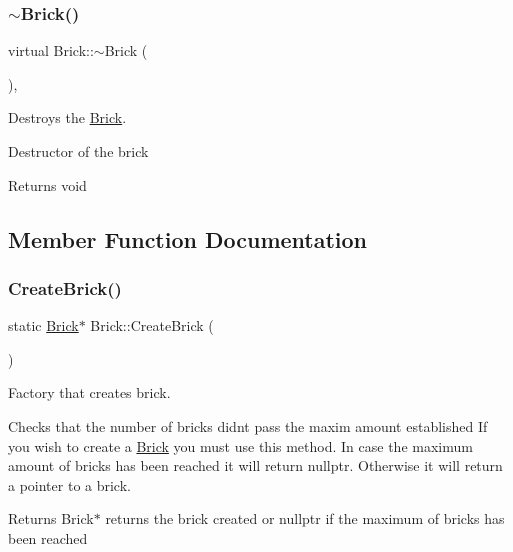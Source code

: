 \subsubsection{\texorpdfstring{$\sim$\+Brick()}{~Brick()}}
{\footnotesize\ttfamily virtual Brick\+::$\sim$\+Brick (\begin{DoxyParamCaption}{ }\end{DoxyParamCaption})\hspace{0.3cm}{\ttfamily [inline]}, {\ttfamily [virtual]}}



Destroys the \hyperlink{class_brick}{Brick}. 

Destructor of the brick

\begin{DoxyReturn}{Returns}
void 
\end{DoxyReturn}


\subsection{Member Function Documentation}
\mbox{\label{class_brick_aa7612e167304813054c4de49a29c2201}} 
\subsubsection{\texorpdfstring{Create\+Brick()}{CreateBrick()}}
{\footnotesize\ttfamily static \hyperlink{class_brick}{Brick}$\ast$ Brick\+::\+Create\+Brick (\begin{DoxyParamCaption}{ }\end{DoxyParamCaption})\hspace{0.3cm}{\ttfamily [static]}}



Factory that creates brick. 

Checks that the number of bricks didn\textquotesingle{}t pass the maxim amount established If you wish to create a \hyperlink{class_brick}{Brick} you must use this method. In case the maximum amount of bricks has been reached it will return nullptr. Otherwise it will return a pointer to a brick.

\begin{DoxyReturn}{Returns}
Brick$\ast$ returns the brick created or nullptr if the maximum of bricks has been reached 
\end{DoxyReturn}
\mbox{\label{class_brick_a7dfd26b24b96fe84b8c8da2094382e4c}} 
